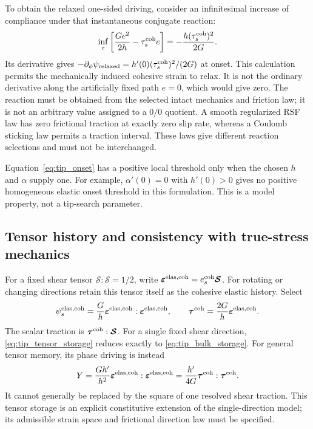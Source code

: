 \documentclass[10pt,a4paper]{article}
\begin{document}
To obtain the relaxed one-sided driving, consider an infinitesimal increase
of compliance under that instantaneous conjugate reaction:
\begin{equation}
 \inf_e\left[\frac{Ge^2}{2h}-\tau_s^{\rm coh}e\right]
       =-\frac{h(\tau_s^{\rm coh})^2}{2G}.
 \label{eq:tip_relaxed_energy}
\end{equation}
Its derivative gives $-\partial_\phi\psi_{\rm relaxed}
=h'(0)(\tau_s^{\rm coh})^2/(2G)$ at onset.
This calculation permits the mechanically induced cohesive strain to relax.
It is not the ordinary derivative along the artificially fixed path $e=0$,
which would give zero. The reaction must be obtained from the selected intact
mechanics and friction law; it is not an arbitrary value assigned to a $0/0$
quotient. A smooth regularized RSF law has zero frictional traction at exactly
zero slip rate, whereas a Coulomb sticking law permits a traction interval.
These laws give different reaction selections and must not be interchanged.

Equation~\eqref{eq:tip_onset} has a positive local threshold only when the
chosen $h$ and $\alpha$ supply one. For example, $\alpha'(0)=0$ with
$h'(0)>0$ gives no positive homogeneous elastic onset threshold in this
formulation. This is a model property, not a tip-search parameter.

\subsection{Tensor history and consistency with true-stress mechanics}
\label{app:tip_tensor}

For a fixed shear tensor $\bm{\mathcal S}:\bm{\mathcal S}=1/2$, write
$\bm\varepsilon^{\rm elas,coh}=e_s^{\rm coh}\bm{\mathcal S}$.
For rotating or changing directions retain this tensor itself as the
cohesive elastic history. Select
\begin{equation}
 \psi_s^{\rm elas,coh}
 =\frac{G}{h}\bm\varepsilon^{\rm elas,coh}:
                       \bm\varepsilon^{\rm elas,coh},
 \qquad
 \bm\tau^{\rm coh}=\frac{2G}{h}\bm\varepsilon^{\rm elas,coh}.
 \label{eq:tip_tensor_storage}
\end{equation}
The scalar traction is $\bm\tau^{\rm coh}:\bm{\mathcal S}$.
For a single fixed shear direction, \eqref{eq:tip_tensor_storage} reduces
exactly to \eqref{eq:tip_bulk_storage}.
For general tensor memory, its phase driving is instead
\begin{equation}
 Y=\frac{G h'}{h^2}\bm\varepsilon^{\rm elas,coh}:
                         \bm\varepsilon^{\rm elas,coh}
   =\frac{h'}{4G}\bm\tau^{\rm coh}:\bm\tau^{\rm coh}.
 \label{eq:tip_tensor_driving}
\end{equation}
It cannot generally be replaced by the square of one resolved shear traction.
This tensor storage is an explicit constitutive extension of the single-direction
model; its admissible strain space and frictional direction law must be specified.
\end{document}
